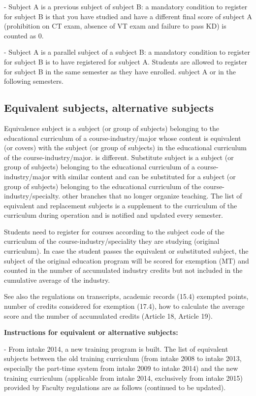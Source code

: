 - Subject A is a previous subject of subject B: a mandatory condition to register for subject B is that you have studied and have a different final score of subject A (prohibition on CT exam, absence of VT exam and failure to pass KD) is counted as 0.

- Subject A is a parallel subject of a subject B: a mandatory condition to register for subject B is to have registered for subject A. Students are allowed to register for subject B in the same semester as they have enrolled. subject A or in the following semesters.

\subsection{Equivalent subjects, alternative subjects}
Equivalence subject is a subject (or group of subjects) belonging to the educational curriculum of a course-industry/major whose content is equivalent (or covers) with the subject (or group of subjects) in the educational curriculum of the course-industry/major. is different. Substitute subject is a subject (or group of subjects) belonging to the educational curriculum of a course-industry/major with similar content and can be substituted for a subject (or group of subjects) belonging to the educational curriculum of the course-industry/specialty. other branches that no longer organize teaching. The list of equivalent and replacement subjects is a supplement to the curriculum of the curriculum during operation and is notified and updated every semester.

Students need to register for courses according to the subject code of the curriculum of the course-industry/speciality they are studying (original curriculum). In case the student passes the equivalent or substituted subject, the subject of the original education program will be scored for exemption (MT) and counted in the number of accumulated industry credits but not included in the cumulative average of the industry.

See also the regulations on transcripts, academic records (15.4) exempted points, number of credits considered for exemption (17.4), how to calculate the average score and the number of accumulated credits (Article 18, Article 19).

\noindent\large\textbf{Instructions for equivalent or alternative subjects:}

- From intake 2014, a new training program is built. The list of equivalent subjects between the old training curriculum (from intake 2008 to intake 2013, especially the part-time system from intake 2009 to intake 2014) and the new training curriculum (applicable from intake 2014, exclusively from intake 2015) provided by Faculty regulations are as follows (continued to be updated).

